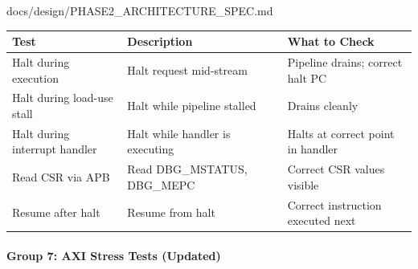 \begin{relocated}{docs/design/PHASE2_ARCHITECTURE_SPEC.md}
{
\begin{longtable}[]{@{}
  >{\raggedright\arraybackslash}p{}
  >{\raggedright\arraybackslash}p{}
  >{\raggedright\arraybackslash}p{}@{}}
\toprule\noalign{}
\begin{minipage}[b]{\linewidth}\raggedright
Test
\end{minipage} & \begin{minipage}[b]{\linewidth}\raggedright
Description
\end{minipage} & \begin{minipage}[b]{\linewidth}\raggedright
What to Check
\end{minipage} \\
\midrule\noalign{}
\endhead
\bottomrule\noalign{}
\endlastfoot
Halt during execution & Halt request mid-stream & Pipeline drains;
correct halt PC \\
Halt during load-use stall & Halt while pipeline stalled & Drains
cleanly \\
Halt during interrupt handler & Halt while handler is executing & Halts
at correct point in handler \\
Read CSR via APB & Read DBG\_\allowbreak{}MSTATUS, DBG\_MEPC & Correct
CSR values visible \\
Resume after halt & Resume from halt & Correct instruction executed
next \\
\end{longtable}
}

\paragraph{Group 7: AXI Stress Tests (Updated)}\label{ds:ch:phase2-architecture:group-7-axi-stress-tests-updated}


\end{relocated}
